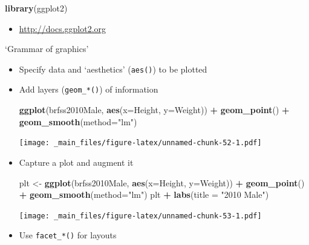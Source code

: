 \documentclass[]{article}
\newenvironment{Shaded}{\begin{snugshade}}{\end{snugshade}}
\newcommand{\KeywordTok}[1]{\textcolor[rgb]{0.13,0.29,0.53}{\textbf{#1}}}
\newcommand{\DataTypeTok}[1]{\textcolor[rgb]{0.13,0.29,0.53}{#1}}
\newcommand{\StringTok}[1]{\textcolor[rgb]{0.31,0.60,0.02}{#1}}
\newcommand{\OperatorTok}[1]{\textcolor[rgb]{0.81,0.36,0.00}{\textbf{#1}}}
\newcommand{\NormalTok}[1]{#1}
\providecommand{\tightlist}{%
  \setlength{\itemsep}{0pt}\setlength{\parskip}{0pt}}
\theoremstyle{definition}
\theoremstyle{definition}
\theoremstyle{remark}
\begin{document}
\begin{Shaded}
\begin{Highlighting}[]
\KeywordTok{library}\NormalTok{(ggplot2)}
\end{Highlighting}
\end{Shaded}

\begin{itemize}
\tightlist
\item
  \url{http://docs.ggplot2.org}
\end{itemize}

`Grammar of graphics'

\begin{itemize}
\item
  Specify data and `aesthetics' (\texttt{aes()}) to be plotted
\item
  Add layers (\texttt{geom\_*()}) of information

\begin{Shaded}
\begin{Highlighting}[]
\KeywordTok{ggplot}\NormalTok{(brfss2010Male, }\KeywordTok{aes}\NormalTok{(}\DataTypeTok{x=}\NormalTok{Height, }\DataTypeTok{y=}\NormalTok{Weight)) }\OperatorTok{+}
\StringTok{    }\KeywordTok{geom_point}\NormalTok{() }\OperatorTok{+}
\StringTok{    }\KeywordTok{geom_smooth}\NormalTok{(}\DataTypeTok{method=}\StringTok{"lm"}\NormalTok{)}
\end{Highlighting}
\end{Shaded}

  \texttt{[image: \_main\_files/figure-latex/unnamed-chunk-52-1.pdf]}
\item
  Capture a plot and augment it

\begin{Shaded}
\begin{Highlighting}[]
\NormalTok{plt <-}\StringTok{ }\KeywordTok{ggplot}\NormalTok{(brfss2010Male, }\KeywordTok{aes}\NormalTok{(}\DataTypeTok{x=}\NormalTok{Height, }\DataTypeTok{y=}\NormalTok{Weight)) }\OperatorTok{+}
\StringTok{    }\KeywordTok{geom_point}\NormalTok{() }\OperatorTok{+}
\StringTok{    }\KeywordTok{geom_smooth}\NormalTok{(}\DataTypeTok{method=}\StringTok{"lm"}\NormalTok{)}
\NormalTok{plt }\OperatorTok{+}\StringTok{ }\KeywordTok{labs}\NormalTok{(}\DataTypeTok{title =} \StringTok{"2010 Male"}\NormalTok{)}
\end{Highlighting}
\end{Shaded}

  \texttt{[image: \_main\_files/figure-latex/unnamed-chunk-53-1.pdf]}
\item
  Use \texttt{facet\_*()} for layouts


\end{itemize}
\end{document}
